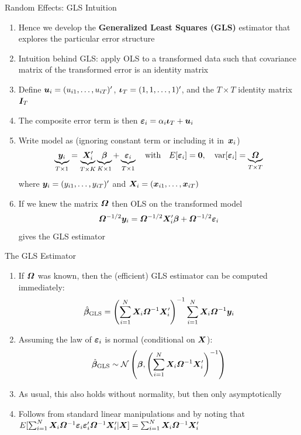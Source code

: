 \documentclass[english, professionalfonts,smaller,xcolor=dvipsnames]{beamer}
\begin{document}
\begin{frame}{Random Effects: GLS Intuition}
\begin{enumerate}
\item[$\Rightarrow$] Hence we develop the {\bf Generalized Least Squares (GLS)} estimator that explores the particular error structure
\item[$\Rightarrow$] Intuition behind GLS: apply OLS to a transformed data such that covariance matrix of the transformed error is an identity matrix
\item[$\Rightarrow$] Define $\bm u_i = (u_{i1},\ldots,u_{iT})'$, $\bm \iota_T = (1,1,\ldots,1)'$, and the $T\times T$ identity matrix~$\bm I_T$
\item[$\Rightarrow$] The composite error term is then $\bm \varepsilon_i = \alpha_i \bm \iota_T +\bm u_i$
\item[$\Rightarrow$] Write model as (ignoring constant term or including it in~$\bm x_i$)
$$
\underbrace{\bm y_i}_{T\times 1} = \underbrace{\bm X_i'}_{T\times K}\underbrace{\bm \beta}_{K\times 1}+\underbrace{\bm \varepsilon_i}_{T\times 1}
\quad \text{with} \quad E[\bm \varepsilon_i] = \boldsymbol{0} ,
\quad \operatorname{var}[\bm \varepsilon_i] = \underbrace{\bm \varOmega}_{T\times T}
$$
where $\bm y_i = (y_{i1},\ldots,y_{iT})'$ and $\bm X_i = (\bm x_{i1},\ldots,\bm x_{iT})$
\item[$\Rightarrow$] If we knew the matrix $\bm \varOmega$ then OLS on the transformed model
$$
\bm \varOmega^{-1/2}\bm y_i = \bm \varOmega^{-1/2}\bm X_i'\bm \beta + \bm \varOmega^{-1/2}\bm \varepsilon_i 
$$
gives the GLS estimator
\end{enumerate}
\end{frame}

\begin{frame}{The GLS Estimator}
\begin{enumerate}
\item[$\Rightarrow$] If $\bm \varOmega$ was known, then the (efficient) GLS estimator can be computed immediately:
$$
\hat{\bm \beta}_{\text{GLS}} = \left(\sum_{i=1}^N \bm X_i \bm \varOmega^{-1} \bm X_i'\right)^{-1} \sum_{i=1}^N \bm X_i \bm \varOmega^{-1} \bm y_i 
$$
\item[$\Rightarrow$] Assuming the law of $\bm \varepsilon_i$ is normal (conditional on $\bm X$):
$$
\hat{\bm \beta}_{\text{GLS}} \sim \mathcal{N} \left( \bm \beta , \left(\sum_{i=1}^N \bm X_i \bm \varOmega^{-1} \bm X_i' \right)^{-1}\right)
$$
\item[$\Rightarrow$] As usual, this also holds without normality, but then only asymptotically 
\item[$\Rightarrow$] Follows from standard linear manipulations and by noting that $E[\sum_{i=1}^N \bm X_i \bm \varOmega^{-1} \bm \varepsilon_i \bm \varepsilon_i' \bm \varOmega^{-1} \bm X_i' |\bm X] =\sum_{i=1}^N \bm X_i \bm \varOmega^{-1} \bm X_i'$
\end{enumerate}
\end{frame}
\end{document}
